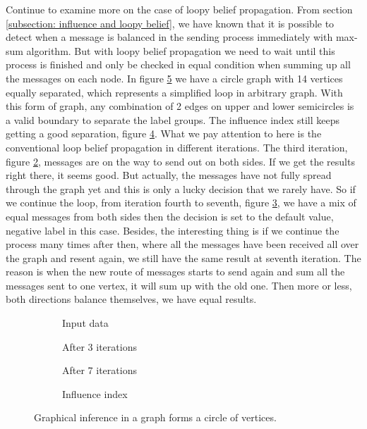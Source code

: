 Continue to examine more on the case of loopy belief propagation. From section \ref{subsection: influence and loopy belief}, we have known that it is possible to detect when a message is balanced in the sending process immediately with max-sum algorithm. But with loopy belief propagation we need to wait until this process is finished and only be checked in equal condition when summing up all the messages on each node. In figure \ref{fig4: synthetic data: circle} we have a circle graph with 14 vertices equally separated, which represents a simplified loop in arbitrary graph. With this form of graph, any combination of 2 edges on upper and lower semicircles is a valid boundary to separate the label groups. The influence index still keeps getting a good separation, figure \ref{fig4d: synthetic data: circle}. What we pay attention to here is the conventional loop belief propagation in different iterations. The third iteration, figure \ref{fig4b: synthetic data: circle}, messages are on the way to send out on both sides. If we get the results right there, it seems good. But actually, the messages have not fully spread through the graph yet and this is only a lucky decision that we rarely have. So if we continue the loop, from iteration fourth to seventh, figure \ref{fig4c: synthetic data: circle}, we have a mix of equal messages from both sides then the decision is set to the default value, negative label in this case. Besides, the interesting thing is if we continue the process many times after then, where all the messages have been received all over the graph and resent again, we still have the same result at seventh iteration. The reason is when the new route of messages starts to send again and sum all the messages sent to one vertex, it will sum up with the old one. Then more or less, both directions balance themselves, we have equal results.

\begin{figure}[t!]
	\centering
	\captionsetup[subfigure]{justification=centering}
	\begin{subfigure}[b]{0.24\textwidth}
		\centering
		
		\caption{Input data}
		\label{fig4a: synthetic data: circle}
	\end{subfigure}
	\hfill
	\begin{subfigure}[b]{0.24\textwidth}
		\centering
		
		\caption{After 3 iterations}
		\label{fig4b: synthetic data: circle}
	\end{subfigure}
	\hfill
	\begin{subfigure}[b]{0.24\textwidth}
		\centering
		
		\caption{After 7 iterations}
		\label{fig4c: synthetic data: circle}
	\end{subfigure}
	\hfill
	\begin{subfigure}[b]{0.24\textwidth}
		\centering
		
		\caption{Influence index}
		\label{fig4d: synthetic data: circle}
	\end{subfigure}
	\caption{Graphical inference in a graph forms a circle of vertices.}
	\label{fig4: synthetic data: circle}
\end{figure}


